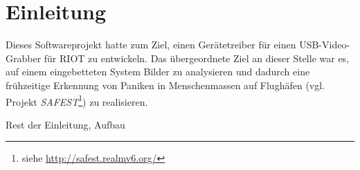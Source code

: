 \section{Einleitung}
Dieses Softwareprojekt hatte zum Ziel, einen Gerätetreiber für einen USB-Video-Grabber für RIOT zu entwickeln.
Das übergeordnete Ziel an dieser Stelle war es, auf einem eingebetteten System Bilder zu analysieren und dadurch eine frühzeitige  Erkennung von Paniken in Menschenmassen auf Flughäfen (vgl. Projekt \emph{SAFEST}\footnote{siehe \url{http://safest.realmv6.org/}}) zu realisieren.

{\huge Rest der Einleitung, Aufbau}